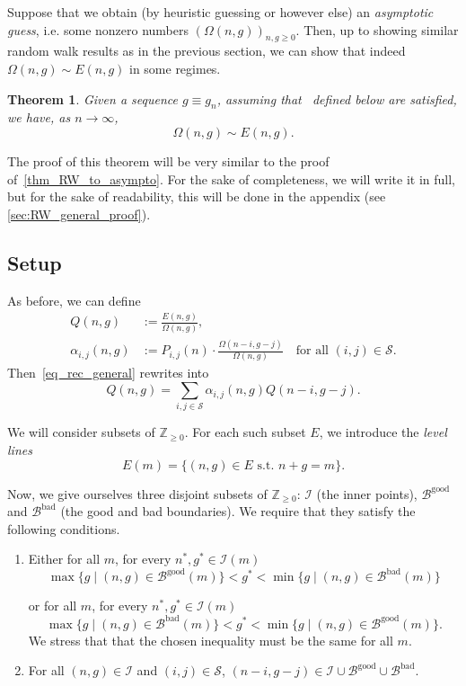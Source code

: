 \documentclass[a4paper,12pt]{article}
\newtheorem{theorem}{Theorem}
\theoremstyle{definition}
\newcommand{\ZZ}{\mathbb{Z}}
\newcommand{\E}{E}
\newcommand{\nto}{\ensuremath{n\rightarrow\infty}}
\newcommand{\goodB}{\mathcal{B}^{\text{good}}}
\newcommand{\badB}{\mathcal{B}^{\text{bad}}}
\begin{document}
Suppose that we obtain (by heuristic guessing or however else) an \emph{asymptotic guess}, i.e. some nonzero numbers $(\Omega(n,g))_{n,g\geq 0}$. Then, up to showing similar random walk results as in the previous section, we can show that indeed $\Omega(n,g)\sim E(n,g)$ in some regimes.

\begin{theorem}\label{thm_walk_general}
Given a sequence $g\equiv g_n$, assuming that~ defined below are satisfied, we have, as $\nto$,
\[\Omega(n,g)\sim E(n,g).\]
\end{theorem}

The proof of this theorem will be very similar to the proof of~\cref{thm_RW_to_asympto}. For the sake of completeness, we will write it in full, but for the sake of readability, this will be done in the appendix (see \cref{sec:RW_general_proof}).


\subsection{Setup}


As before, we can define
\begin{align}
Q(n,g)&:=\frac{\E(n,g)}{\Omega(n,g)}, \\
    \alpha_{i,j}(n,g) &:= P_{i,j}(n)\cdot \frac{\Omega(n-i,g-j)}{\Omega(n,g)}\quad \text{for all }(i,j)\in\mathcal S. \label{eq_def_alpha_general}
\end{align}
Then~\eqref{eq_rec_general} rewrites into
\begin{equation}\label{eq_Q_general}
    Q(n,g)=\sum_{i,j\in\mathcal{S}} \alpha_{i,j}(n,g)Q(n-i,g-j).
\end{equation}

 We will consider subsets of $\ZZ_{\geq0}$. For each such subset $E$, we introduce the \emph{level lines}
\[E(m)=\{(n,g)\in E\text{ s.t. }n+g=m\}.\]

Now, we give ourselves three disjoint subsets of $\ZZ_{\geq0}$: $\mathcal I$ (the inner points), $\goodB$ and $\badB$ (the good and bad boundaries). We require that they satisfy the following conditions.
\begin{enumerate}
    \item Either for all $m$, for every $n^*,g^*\in\mathcal I (m)$
    \begin{equation}\max\{g\mid (n,g)\in \goodB(m)\}<g^*<\min\{g\mid (n,g)\in \badB(m)\}
    \label{eq_C-}\tag{C$-$}\end{equation}
   
    or for all $m$, for every $n^*,g^*\in\mathcal I (m)$
    \begin{equation}\max\{g\mid (n,g)\in \badB(m)\}<g^*<\min\{g\mid (n,g)\in \goodB(m)\}.\label{eq_C+}\tag{C$+$}\end{equation} We stress that that the chosen inequality must be the same for all $m$.
    \item For all $(n,g)\in \mathcal I$ and $(i,j)\in \mathcal{S}$, $(n-i,g-j)\in \mathcal I \cup\goodB\cup\badB$.
\end{enumerate}
\end{document}
